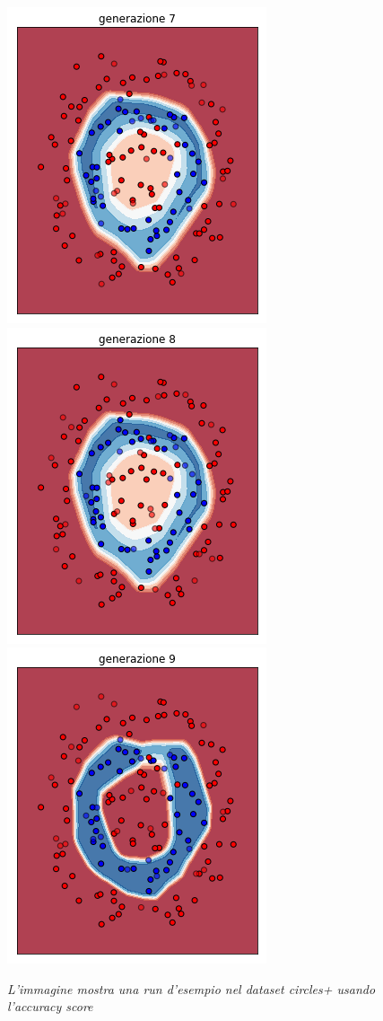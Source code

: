 \documentclass[12pt,a4paper]{report}
\begin{document}
\begin{figure}[H]
 \includegraphics[scale = 0.3]{images/circle+-rnd-acc./7}
 \includegraphics[scale = 0.3]{images/circle+-rnd-acc./8}
 \includegraphics[scale = 0.3]{images/circle+-rnd-acc./9}
 \caption{\textit{L'immagine mostra una run d'esempio nel dataset circles+ usando l'accuracy score}}
 \label{circles+1}
\end{figure}
\end{document}
